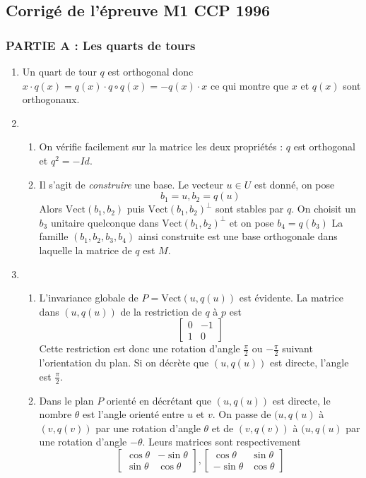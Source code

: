 \subsection*{Corrigé de l'épreuve M1 CCP 1996}
\subsubsection*{PARTIE A : Les quarts de tours}
\begin{enumerate}
\item Un quart de tour $q$ est orthogonal donc
$x\cdot q(x)= q(x)\cdot q\circ q(x)=- q(x)\cdot x$ ce qui montre que $x$ et $q(x)$ sont orthogonaux.
\item \begin{enumerate}
\item On vérifie facilement sur la matrice les deux propriétés : $q$ est orthogonal et $q^{2}=-Id$.
\item Il s'agit de \emph{construire} une base. Le vecteur $u\in U$ est donné, on pose \[b_{1}=u,b_{2}=q(u)\] Alors $\mathrm{Vect}(b_{1},b_{2})$ puis $\mathrm{Vect}(b_{1},b_{2})^{\bot }$ sont stables par $q$. On choisit un $b_{3}$ unitaire quelconque dans $\mathrm{Vect}(b_{1},b_{2})^{\bot }$ et on pose $b_{4}=q(b_{3})$ La famille $(b_{1},b_{2},b_{3},b_{4})$ ainsi construite est une base orthogonale dans laquelle la matrice de $q$ est $M$.
\end{enumerate}
\item \begin{enumerate}
\item L'invariance globale de $P=\mathrm{Vect}(u,q(u))$ est évidente. La matrice dans $(u,q(u))$ de la restriction de $q$ à $p$ est 
\[\left [
\begin{array}{cc}
0 & -1\\
1 & 0
\end{array}
\right ]
\]
Cette restriction est donc une rotation d'angle $\frac{\pi}{2}$ ou $-\frac{\pi}{2}$ suivant l'orientation du plan. Si on décrète que $(u,q(u))$ est directe, l'angle est $\frac{\pi}{2}$.
\item Dans le plan $P$ orienté en décrétant que $(u,q(u))$ est directe, le nombre $\theta$ est l'angle orienté entre $u$ et $v$. On passe de $(u,q(u)$ à $(v,q(v))$ par une rotation d'angle $\theta$ et de $(v,q(v))$ à $(u,q(u)$ par une rotation d'angle $-\theta$. Leurs matrices sont respectivement
\[\left [
\begin{array}{cc}\cos\theta & -\sin\theta\\\sin\theta & \cos\theta
\end{array}
\right ],
 \left [
\begin{array}{cc} \cos\theta & \sin\theta\\-\sin\theta & \cos\theta
\end{array}
\right ]\]
\end{enumerate}


\end{enumerate}
